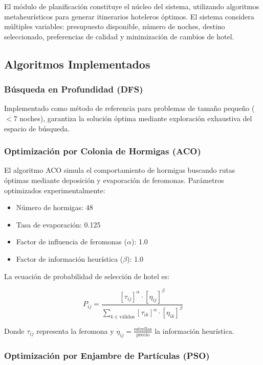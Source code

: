 \documentclass[runningheads]{llncs}
\begin{document}
El módulo de planificación constituye el núcleo del sistema, utilizando algoritmos metaheurísticos para generar itinerarios hoteleros óptimos. El sistema considera múltiples variables: presupuesto disponible, número de noches, destino seleccionado, preferencias de calidad y minimización de cambios de hotel.

\subsection{Algoritmos Implementados}

\subsubsection{Búsqueda en Profundidad (DFS)}

Implementado como método de referencia para problemas de tamaño pequeño ($< 7$ noches), garantiza la solución óptima mediante exploración exhaustiva del espacio de búsqueda.


\subsubsection{Optimización por Colonia de Hormigas (ACO)}

El algoritmo ACO simula el comportamiento de hormigas buscando rutas óptimas mediante deposición y evaporación de feromonas. Parámetros optimizados experimentalmente:

\begin{itemize}
\item Número de hormigas: 48
\item Tasa de evaporación: 0.125
\item Factor de influencia de feromonas ($\alpha$): 1.0
\item Factor de información heurística ($\beta$): 1.0
\end{itemize}

La ecuación de probabilidad de selección de hotel es:

\begin{equation}
P_{ij} = \frac{[\tau_{ij}]^{\alpha} \cdot [\eta_{ij}]^{\beta}}{\sum_{k \in \text{válidos}}[\tau_{ik}]^{\alpha} \cdot [\eta_{ik}]^{\beta}}
\end{equation}

Donde $\tau_{ij}$ representa la feromona y $\eta_{ij} = \frac{\text{estrellas}}{\text{precio}}$ la información heurística.

\subsubsection{Optimización por Enjambre de Partículas (PSO)}
\end{document}

